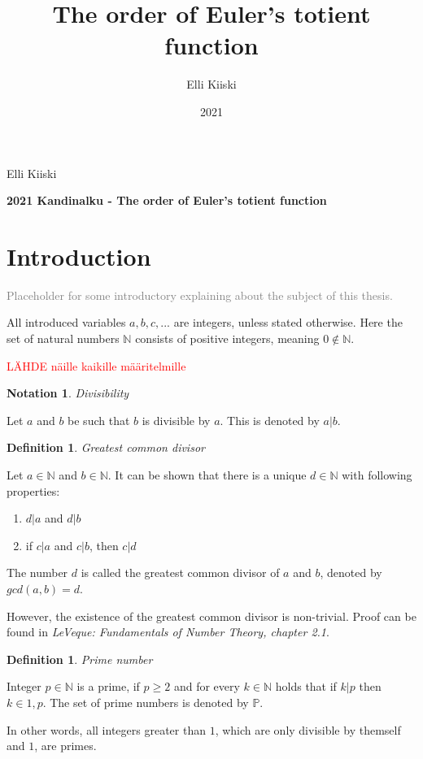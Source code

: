 \documentclass{article}
\title{The order of Euler's totient function}
\author{Elli Kiiski}
\date{2021}
\theoremstyle{definition}
\newtheorem{definition}[subsubsection]{Definition}
\newtheorem{notation}[subsubsection]{Notation}
\begin{document}
{\large
Elli Kiiski
\par
\textbf{2021 Kandinalku - The order of Euler's totient function}
}
\vspace{0.5cm}

\section{Introduction}

\textcolor{gray}{Placeholder for some introductory explaining about the subject of this thesis.}

All introduced variables $a, b, c, ...$ are integers, unless stated otherwise. Here the set of natural numbers $\mathbb{N}$ consists of positive integers, meaning $0 \not\in \mathbb{N}$.

\textcolor{red}{LÄHDE näille kaikille määritelmille}

\begin{notation}{\emph{Divisibility}}

Let $a$ and $b$ be such that $b$ is divisible by $a$. This is denoted by $a \vert b$.

\end{notation}

\begin{definition}{\emph{Greatest common divisor}}

Let $a \in \mathbb{N}$ and $b \in \mathbb{N}$. It can be shown that there is a unique $d \in \mathbb{N}$ with following properties:

\begin{enumerate}
 \item $d \vert a$ and $d \vert b$
 \item if $c \vert a$ and $c \vert b$, then $c \vert d$
\end{enumerate}

The number $d$ is called the greatest common divisor of $a$ and $b$, denoted by $gcd(a,b) = d$.

However, the existence of the greatest common divisor is non-trivial. Proof can be found in \textit{LeVeque: Fundamentals of Number Theory, chapter 2.1}.

\end{definition}

\begin{definition}{\emph{Prime number}}

Integer $p\in\mathbb{N}$ is a prime, if $p \geq 2$ and for every $k\in\mathbb{N}$ holds that if $k \vert p$ then $k\in{1, p}$. The set of prime numbers is denoted by $\mathbb{P}$.

In other words, all integers greater than $1$, which are only divisible by themself and $1$, are primes.


\end{definition}
\end{document}
